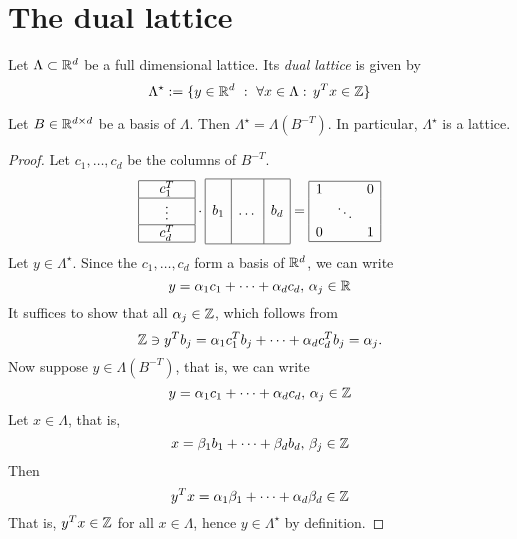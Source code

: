 \section{The dual lattice}

\begin{definition}
  Let $\Lambda \subset \mathbb{R}^d$ be a full dimensional lattice.
  Its \emph{dual lattice} is given by
  \[
    \Lambda^\star := \{ y \in \mathbb{R}^d ~:~ \forall x \in \Lambda:\, y^Tx \in \mathbb{Z} \}
  \]
\end{definition}

\begin{lemma}
  \label{lemma:dual-basis}
  Let $B \in \mathbb{R}^{d \times d}$ be a basis of $\Lambda$.
  Then $\Lambda^\star = \Lambda(B^{-T})$.
  In particular, $\Lambda^\star$ is a lattice.
\end{lemma}
\begin{proof}
  Let $c_1, \ldots, c_d$ be the columns of $B^{-T}$.
  \[
    \begin{array}{|c|}
      \hline \quad c_1^T \quad  \\\hline
      \vdots \\\hline
      c_d^T \\\hline
    \end{array}
    \cdot
    \begin{array}{|c|c|c|}
      \hline  & &\\[0.5em]
      b_1 & \dots & b_d \\
      & & \\[0.5em]\hline
    \end{array}
    =
    \begin{array}{|lcr|}
      \hline 1 & & 0 \\
       & \ddots & \\
      0 & & 1 \\\hline
    \end{array}
  \]
  Let $y \in \Lambda^\star$.
  Since the $c_1, \ldots, c_d$ form a basis of $\mathbb{R}^d$,
  we can write
  \[
    y = \alpha_1 c_1 + \dots + \alpha_d c_d,\, \alpha_j \in \mathbb{R}
  \]
  It suffices to show that all $\alpha_j \in \mathbb{Z}$,
  which follows from
  \[
    \mathbb{Z} \ni y^T b_j = \alpha_1 c_1^T b_j + \dots + \alpha_d c_d^T b_j = \alpha_j.
  \]
  Now suppose $y \in \Lambda(B^{-T})$, that is,
  we can write
  \[
    y = \alpha_1 c_1 + \dots + \alpha_d c_d,\, \alpha_j \in \mathbb{Z}
  \]
  Let $x \in \Lambda$, that is,
  \[
    x = \beta_1 b_1 + \dots + \beta_d b_d,\, \beta_j \in \mathbb{Z}
  \]
  Then
  \[
    y^Tx = \alpha_1 \beta_1 + \dots + \alpha_d \beta_d \in \mathbb{Z}
  \]
  That is, $y^Tx \in \mathbb{Z}$ for all $x \in \Lambda$,
  hence $y \in \Lambda^\star$ by definition.
\end{proof}

